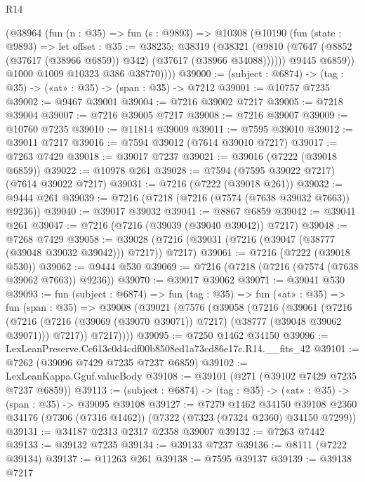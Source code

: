 \begin{lexlean}{R14}
\begin{coremodule}
          (@38964
            (fun (n : @35) =>
            fun (s : @9893) =>
            @10308
              (@10190
                (fun (state : @9893) =>
                let offset : @35 := @38235;
                @38319
                  (@38321
                    (@9810 (@7647 (@8852 (@37617 (@38966 @6859)) @342) (@37617 (@38966 @34088))))))
                @9445
                @6859))
            @1000
            @1009
            @10323
            @386
            @38770))))
@39000 := (subject : @6874) -> (tag : @35) -> («at» : @35) -> (span : @35) -> @7212
@39001 := @10757 @7235
@39002 := @9467 @39001
@39004 := @7216 @39002 @7217
@39005 := @7218 @39004
@39007 := @7216 @39005 @7217
@39008 := @7216 @39007
@39009 := @10760 @7235
@39010 := @11814 @39009
@39011 := @7595 @39010
@39012 := @39011 @7217
@39016 := @7594 @39012 (@7614 @39010 @7217)
@39017 := @7263 @7429
@39018 := @39017 @7237
@39021 := @39016 (@7222 (@39018 @6859))
@39022 := @10978 @261
@39028 := @7594 (@7595 @39022 @7217) (@7614 @39022 @7217)
@39031 := @7216 (@7222 (@39018 @261))
@39032 := @9444 @261
@39039 := @7216 (@7218 (@7216 (@7574 (@7638 @39032 @7663)) @9236))
@39040 := @39017 @39032
@39041 := @8867 @6859
@39042 := @39041 @261
@39047 := @7216 (@7216 (@39039 (@39040 @39042)) @7217)
@39048 := @7268 @7429
@39058 := @39028 (@7216 (@39031 (@7216 (@39047 (@38777 (@39048 @39032 @39042))) @7217)) @7217)
@39061 := @7216 (@7222 (@39018 @530))
@39062 := @9444 @530
@39069 := @7216 (@7218 (@7216 (@7574 (@7638 @39062 @7663)) @9236))
@39070 := @39017 @39062
@39071 := @39041 @530
@39093 := fun (subject : @6874) =>
  fun (tag : @35) =>
  fun («at» : @35) =>
  fun (span : @35) =>
  @39008
    (@39021
      (@7576
        (@39058
          (@7216
            (@39061
              (@7216
                (@7216 (@7216 (@39069 (@39070 @39071)) @7217) (@38777 (@39048 @39062 @39071)))
                @7217))
            @7217))))
@39095 := @7250 @1462 @34150
@39096 := LexLeanPreserve.Cc613c0d4cdf00b8508ed1a73cd86e17c.R14.__fits_42
@39101 := @7262 (@39096 @7429 @7235 @7237 @6859)
@39102 := LexLeanKappa.Gguf.valueBody
@39108 := @39101 (@271 (@39102 @7429 @7235 @7237 @6859))
@39113 := (subject : @6874) -> (tag : @35) -> («at» : @35) -> (span : @35) -> @39095 @39108
@39127 := @7279
    @1462
    @34150
    @39108
    @2360
    @34176
    (@7306 (@7316 @1462))
    (@7322 (@7323 (@7324 @2360) @34150 @7299))
@39131 := @34187 @2313 @2317 @2358 @39007
@39132 := @7263 @7442
@39133 := @39132 @7235
@39134 := @39133 @7237
@39136 := @8111 (@7222 @39134)
@39137 := @11263 @261
@39138 := @7595 @39137
@39139 := @39138 @7217

\end{coremodule}
\end{lexlean}
